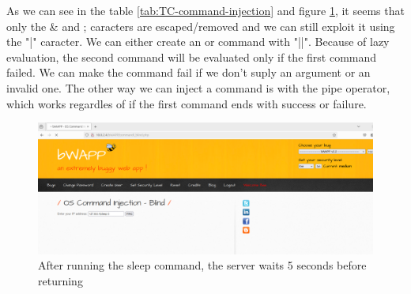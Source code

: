 \documentclass{article}
\begin{document}
As we can see in the table \ref{tab:TC-command-injection} and figure \ref{fig:sleep-command}, it seems that only the \& and ; caracters are escaped/removed and we can still exploit it using the "|" caracter.
We can either create an or command with "||". Because of lazy evaluation, the second command will be evaluated only if the first command failed.
We can make the command fail if we don't suply an argument or an invalid one.
The other way we can inject a command is with the pipe operator, which works regardles of if the first command ends with success or failure.

\begin{figure}[H]
    \centering
    \includegraphics[width=1\linewidth]{Figures/command-injection/sleep-command.png}
    \caption{\label{fig:sleep-command}After running the sleep command, the server waits 5 seconds before returning}
\end{figure}
\end{document}
